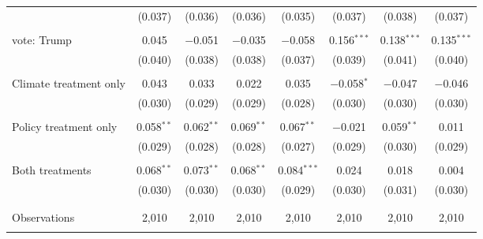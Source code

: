 \begin{tabular}{@{\extracolsep{5pt}}lccccccc}
  & (0.037) & (0.036) & (0.036) & (0.035) & (0.037) & (0.038) & (0.037) \\ 
  & & & & & & & \\ 
 vote: Trump & 0.045 & $-$0.051 & $-$0.035 & $-$0.058 & 0.156$^{***}$ & 0.138$^{***}$ & 0.135$^{***}$ \\ 
  & (0.040) & (0.038) & (0.038) & (0.037) & (0.039) & (0.041) & (0.040) \\ 
  & & & & & & & \\ 
 Climate treatment only & 0.043 & 0.033 & 0.022 & 0.035 & $-$0.058$^{*}$ & $-$0.047 & $-$0.046 \\ 
  & (0.030) & (0.029) & (0.029) & (0.028) & (0.030) & (0.030) & (0.030) \\ 
  & & & & & & & \\ 
 Policy treatment only & 0.058$^{**}$ & 0.062$^{**}$ & 0.069$^{**}$ & 0.067$^{**}$ & $-$0.021 & 0.059$^{**}$ & 0.011 \\ 
  & (0.029) & (0.028) & (0.028) & (0.027) & (0.029) & (0.030) & (0.029) \\ 
  & & & & & & & \\ 
 Both treatments & 0.068$^{**}$ & 0.073$^{**}$ & 0.068$^{**}$ & 0.084$^{***}$ & 0.024 & 0.018 & 0.004 \\ 
  & (0.030) & (0.030) & (0.030) & (0.029) & (0.030) & (0.031) & (0.030) \\ 
  & & & & & & & \\ 
\hline \\[-1.8ex] 

Observations & 2,010 & 2,010 & 2,010 & 2,010 & 2,010 & 2,010 & 2,010 \\ 
\hline 
\hline \\[-1.8ex] 
\end{tabular} 